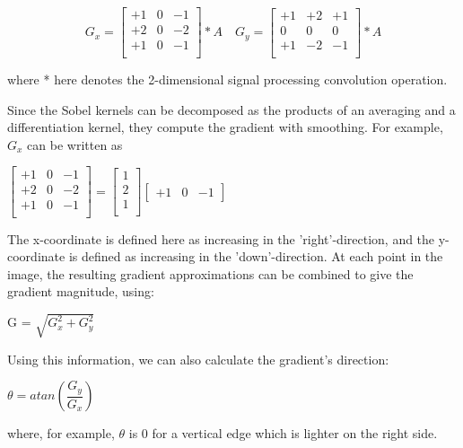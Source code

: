 \[
  G_{x} = 
  \begin{bmatrix}
	+1 & 0 & -1 \\
	+2 & 0 & -2 \\
	+1 & 0 & -1 \\
   \end{bmatrix} * A  \quad
  G_{y} = 
  \begin{bmatrix}
	+1 & +2 & +1 \\
	0 & 0 & 0 \\
	+1 & -2 & -1 \\
  \end{bmatrix} * A
\]

where * here denotes the 2-dimensional signal processing convolution operation.

Since the Sobel kernels can be decomposed as the products of an averaging and a differentiation kernel, they compute the gradient with smoothing. For example, \textbf{$G_{x}$}  can be written as

$  \begin{bmatrix}
	+1 & 0 & -1 \\
	+2 & 0 & -2 \\
	+1 & 0 & -1 \\
   \end{bmatrix} =  \begin{bmatrix}
	1 \\
	2 \\
	1 \\
  \end{bmatrix} \begin{bmatrix}
	+1 & 0 & -1
  \end{bmatrix}
$

The x-coordinate is defined here as increasing in the 'right'-direction, and the y-coordinate is defined as increasing in the 'down'-direction. At each point in the image, the resulting gradient approximations can be combined to give the gradient magnitude, using:

G = $\sqrt{ G_{x}^{2} + G_{y}^{2} }$

Using this information, we can also calculate the gradient's direction:

$\theta = atan(\dfrac{G_{y}}{G_{x}})$

where, for example, $\theta$ is 0 for a vertical edge which is lighter on the right side.\cite{Sobel_Operator}






